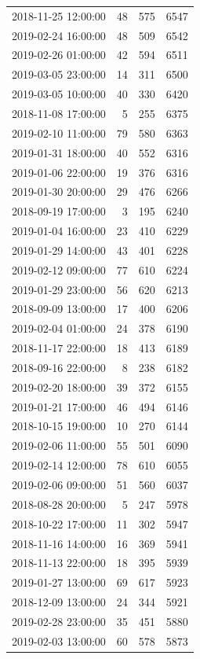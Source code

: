 \begin{tabular}{lrrr}
2018-11-25 12:00:00 & 48 & 575 & 6547 \\
2019-02-24 16:00:00 & 48 & 509 & 6542 \\
2019-02-26 01:00:00 & 42 & 594 & 6511 \\
2019-03-05 23:00:00 & 14 & 311 & 6500 \\
2019-03-05 10:00:00 & 40 & 330 & 6420 \\
2018-11-08 17:00:00 & 5 & 255 & 6375 \\
2019-02-10 11:00:00 & 79 & 580 & 6363 \\
2019-01-31 18:00:00 & 40 & 552 & 6316 \\
2019-01-06 22:00:00 & 19 & 376 & 6316 \\
2019-01-30 20:00:00 & 29 & 476 & 6266 \\
2018-09-19 17:00:00 & 3 & 195 & 6240 \\
2019-01-04 16:00:00 & 23 & 410 & 6229 \\
2019-01-29 14:00:00 & 43 & 401 & 6228 \\
2019-02-12 09:00:00 & 77 & 610 & 6224 \\
2019-01-29 23:00:00 & 56 & 620 & 6213 \\
2018-09-09 13:00:00 & 17 & 400 & 6206 \\
2019-02-04 01:00:00 & 24 & 378 & 6190 \\
2018-11-17 22:00:00 & 18 & 413 & 6189 \\
2018-09-16 22:00:00 & 8 & 238 & 6182 \\
2019-02-20 18:00:00 & 39 & 372 & 6155 \\
2019-01-21 17:00:00 & 46 & 494 & 6146 \\
2018-10-15 19:00:00 & 10 & 270 & 6144 \\
2019-02-06 11:00:00 & 55 & 501 & 6090 \\
2019-02-14 12:00:00 & 78 & 610 & 6055 \\
2019-02-06 09:00:00 & 51 & 560 & 6037 \\
2018-08-28 20:00:00 & 5 & 247 & 5978 \\
2018-10-22 17:00:00 & 11 & 302 & 5947 \\
2018-11-16 14:00:00 & 16 & 369 & 5941 \\
2018-11-13 22:00:00 & 18 & 395 & 5939 \\
2019-01-27 13:00:00 & 69 & 617 & 5923 \\
2018-12-09 13:00:00 & 24 & 344 & 5921 \\
2019-02-28 23:00:00 & 35 & 451 & 5880 \\
2019-02-03 13:00:00 & 60 & 578 & 5873 \\

\end{tabular}
